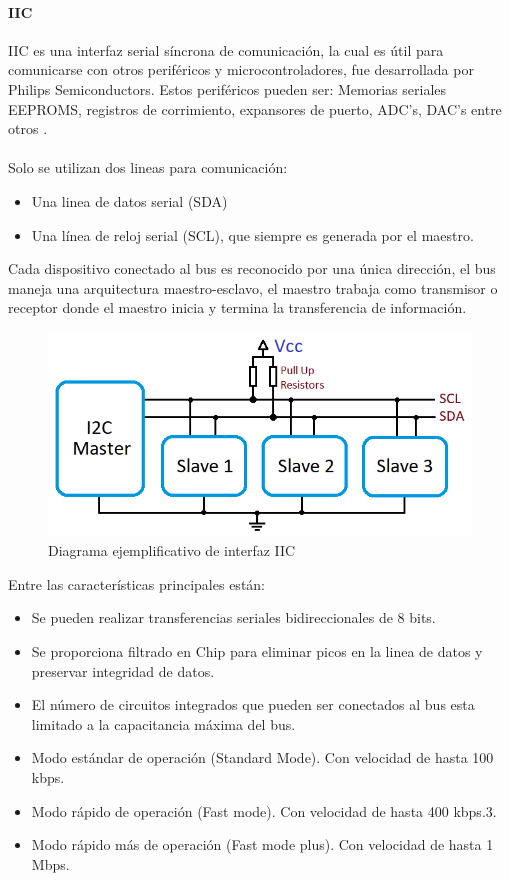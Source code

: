 \paragraph{IIC}
IIC es una interfaz serial síncrona de comunicación, la cual es útil para comunicarse  con otros periféricos y microcontroladores, fue desarrollada por Philips Semiconductors.
Estos periféricos pueden ser: Memorias seriales EEPROMS, registros de corrimiento, expansores de puerto, ADC's, DAC's entre otros \citep{MarcoTeorico17}.
\paragraph{}
Solo se utilizan dos lineas para comunicación:
\begin{itemize}
	\item Una linea de datos serial (SDA)
    \item Una línea de reloj serial (SCL), que siempre es generada por el maestro.
\end{itemize}

Cada dispositivo conectado al bus es reconocido por una única dirección, el bus maneja una arquitectura maestro-esclavo, el maestro trabaja como transmisor o receptor donde el maestro inicia y termina la transferencia de información.

\begin{figure}[H]
	\centering
	\includegraphics[scale=.35]{Capitulo2/images/I2C-Interface.png}
	\caption{Diagrama ejemplificativo de interfaz IIC}
	\label{fig:}
\end{figure}

Entre las características principales están:
\begin{itemize}
	\item Se pueden realizar transferencias seriales bidireccionales de 8 bits.
    \item Se proporciona filtrado en Chip para eliminar picos en la linea de datos y preservar integridad de datos.
    \item El número de circuitos integrados que pueden ser conectados al bus esta limitado a la capacitancia máxima del bus.
    \item Modo estándar de operación (Standard Mode). Con velocidad de hasta 100 kbps.
    \item Modo rápido de operación  (Fast mode). Con velocidad de hasta 400 kbps.3. \item Modo rápido más de operación (Fast mode plus). Con velocidad de hasta 1 Mbps.
\end{itemize}

